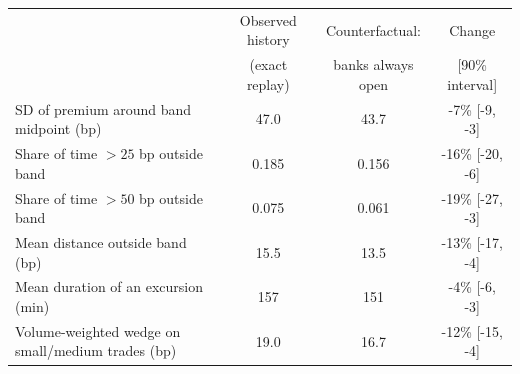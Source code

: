 \begin{tabular}{lccc}
\toprule
 & Observed history & Counterfactual: & Change \\
 & (exact replay) & banks always open & [90\% interval] \\
\midrule
SD of premium around band midpoint (bp) & 47.0 & 43.7 & -7\% [-9, -3] \\
Share of time $>25$ bp outside band & 0.185 & 0.156 & -16\% [-20, -6] \\
Share of time $>50$ bp outside band & 0.075 & 0.061 & -19\% [-27, -3] \\
Mean distance outside band (bp) & 15.5 & 13.5 & -13\% [-17, -4] \\
Mean duration of an excursion (min) & 157 & 151 & -4\% [-6, -3] \\
Volume-weighted wedge on small/medium trades (bp) & 19.0 & 16.7 & -12\% [-15, -4] \\
\bottomrule
\end{tabular}
